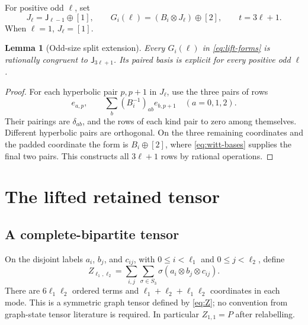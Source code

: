 \documentclass[11pt]{article}
\newtheorem{lemma}[theorem]{Lemma}
\theoremstyle{definition}\newtheorem{definition}[theorem]{Definition}
\theoremstyle{remark}\newtheorem{remark}[theorem]{Remark}
\newcommand{\J}{\mathsf J}
\begin{document}
For positive odd $\ell$, set
\begin{equation}\label{eq:lift-forms}
 J_\ell=\J_{\ell-1}\oplus[1],\qquad
 G_i(\ell)=(B_i\otimes J_\ell)\oplus[2],\qquad t=3\ell+1.
\end{equation}
When $\ell=1$, $J_\ell=[1]$.

\begin{lemma}[Odd-size split extension]\label{lem:odd-split}
Every $G_i(\ell)$ in \eqref{eq:lift-forms} is rationally congruent to $\J_{3\ell+1}$. Its paired basis is explicit for every positive odd $\ell$.
\end{lemma}
\begin{proof}
For each hyperbolic pair $p,p+1$ in $J_\ell$, use the three pairs of rows
\[
 e_{a,p},\qquad \sum_b(B_i^{-1})_{ab}e_{b,p+1}\quad(a=0,1,2).
\]
Their pairings are $\delta_{ab}$, and the rows of each kind pair to zero among themselves. Different hyperbolic pairs are orthogonal. On the three remaining coordinates and the padded coordinate the form is $B_i\oplus[2]$, where \eqref{eq:witt-bases} supplies the final two pairs. This constructs all $3\ell+1$ rows by rational operations.
\end{proof}

\section{The lifted retained tensor}\label{sec:lift}

\subsection{A complete-bipartite tensor}

On the disjoint labels $a_i$, $b_j$, and $c_{ij}$, with $0\leq i<\ell_1$ and $0\leq j<\ell_2$, define
\begin{equation}\label{eq:Z}
 Z_{\ell_1,\ell_2}=\sum_{i,j}\sum_{\sigma\in S_3}
 \sigma(a_i\otimes b_j\otimes c_{ij}).
\end{equation}
There are $6\ell_1\ell_2$ ordered terms and $\ell_1+\ell_2+\ell_1\ell_2$ coordinates in each mode. This is a symmetric graph tensor defined by \eqref{eq:Z}; no convention from graph-state tensor literature is required. In particular $Z_{1,1}=P$ after relabelling.
\end{document}
